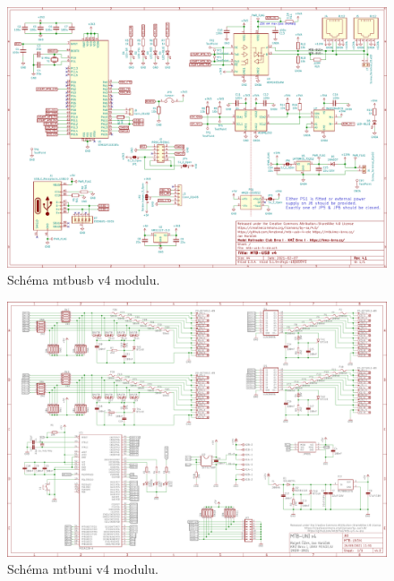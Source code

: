 \vspace{-2em}

\begin{figure}[H]
\includegraphics[angle=90,width=\textwidth]{data/mtb-usb-4-ele.pdf}
\caption{Schéma \gls{mtbusb} v4 modulu.}
\label{fig:mtb-usb-sch}
\end{figure}

\begin{figure}[ht]
\includegraphics[angle=90,width=\textwidth]{data/mtb-uni-4-ele.pdf}
\caption{Schéma \gls{mtbuni} v4 modulu.}
\label{fig:mtb-uni-4-sch}
\end{figure}


